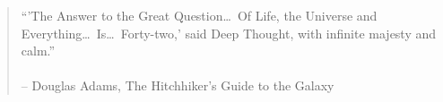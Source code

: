 





	\frontmatter
		
		
		
		\newpage
		\thispagestyle{empty}
		\hspace{1cm}
		\newpage
		\thispagestyle{empty}
		\vspace*{\fill}
		\begin{quote}
			\hfill ``'The Answer to the Great Question\ldots~Of Life, the Universe and Everything\ldots~Is\ldots~Forty-two,' said Deep Thought, with infinite majesty and calm.''\\
			\\
			\hfill – Douglas Adams, The Hitchhiker's Guide to the Galaxy

		\end{quote}
		\vspace*{\fill}
		\newpage
		\tableofcontents
	\mainmatter
		
		
		
		
	\backmatter
		
	\appendix
		\printbibliography[title={Quellenverzeichnis}]
		\printglossary[type=\acronymtype, title=Abkürzungsverzeichnis,toctitle=Abk\"urzungsverzeichnis]%
		\printglossary[type=main, title=Glossar,toctitle=Glossar]
		\listoftables
		\listoffigures
		\listoflistings
		

